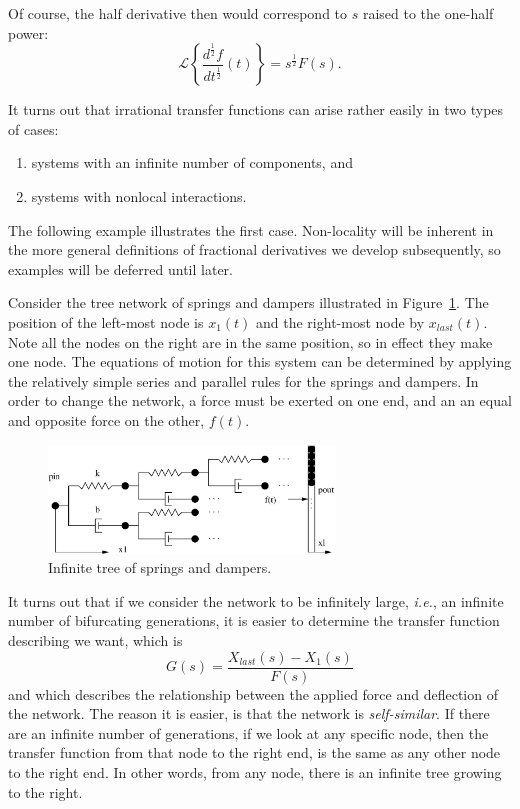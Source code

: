 Of course, the half derivative then would correspond to $s$ raised to the one-half power:
\begin{equation}
  \mathcal L \left\{ \frac{d^\frac{1}{2} f}{d t^\frac{1}{2}}(t) \right\} = s^\frac{1}{2} F(s).
\end{equation}

It turns out that irrational transfer functions can arise rather easily in two types of cases:
\begin{enumerate}
  \item systems with an infinite number of components, and
  \item systems with nonlocal interactions.
\end{enumerate}
The following example illustrates the first case. Non-locality will be inherent in the more general definitions of fractional derivatives we develop subsequently, so examples will be deferred until later.

\begin{example}
  Consider the tree network of springs and dampers illustrated in Figure~\ref{fig:structure}. The position of the left-most node is $x_1(t)$ and the right-most node by $x_{last}(t)$. Note all the nodes on the right are in the same position, so in effect they make one node. The equations of motion for this system can be determined by applying the relatively simple series and parallel rules for the springs and dampers. In order to change the network, a force must be exerted on one end, and an an equal and opposite force on the other, $f(t)$.

  \begin{figure}
    \centering
    \includegraphics[width=3in]{figs/structure}
    \caption{Infinite tree of springs and dampers.}
    \label{fig:structure}
  \end{figure}
\end{example}

It turns out that if we consider the network to be infinitely large, \textit{i.e.}, an infinite number of bifurcating generations, it is easier to determine the transfer function describing we want, which is
\begin{equation}
  G(s) = \frac{X_{last}(s) - X_1(s)}{F(s)}
  \label{eq:xfer}
\end{equation}
and which describes the relationship between the applied force and deflection of the network. The reason it is easier, is that the network is \emph{self-similar}. If there are an infinite number of generations, if we look at any specific node, then the transfer function from that node to the right end, is the same as any other node to the right end. In other words, from any node, there is an infinite tree growing to the right. 

